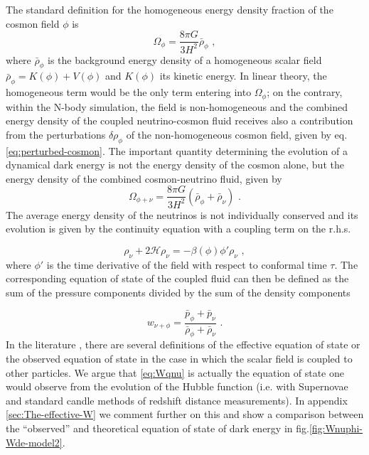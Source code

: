 The standard definition for the homogeneous energy density fraction
of the cosmon field $\phi$ is 
\begin{equation}
\Omega_{\phi}=\frac{8\pi G}{3H^{2}}\bar{\rho}_{\phi}\,\,,
\end{equation}
where $\bar{\rho}_{\phi}$ is the background energy density of a homogeneous
scalar field $\bar{\rho}_{\phi}=K(\phi)+V(\phi)$ and $K(\phi)$ its
kinetic energy. In linear theory, the homogeneous term would be the
only term entering into $\Omega_{\phi}$; on the contrary, within
the N-body simulation, the field is non-homogeneous and the combined
energy density of the coupled neutrino-cosmon fluid receives also
a contribution from the perturbations $\delta\rho_{\phi}$ of the
non-homogeneous cosmon field, given by eq.\ref{eq:perturbed-cosmon}.
The important quantity determining the evolution of a dynamical dark
energy is not the energy density of the cosmon alone, but the energy
density of the combined cosmon-neutrino fluid, given by 
\begin{equation}
\Omega_{\phi+\nu}=\frac{8\pi G}{3H^{2}}\left(\bar{\rho}_{\phi}+\bar{\rho}_{\nu}\right)\,\,.\label{eq:Omega-cosmon+nu}
\end{equation}
The average energy density of the neutrinos is not individually conserved
and its evolution is given by the continuity equation with a coupling
term on the r.h.s. \cite{ayaita_structure_2012,baldi_hydrodynamical_2010}

\begin{equation}
\rho_{\nu}+2\mathcal{H}\rho_{\nu}=-\beta(\phi)\phi'\rho_{\nu}\,\,,
\end{equation}
where $\phi'$ is the time derivative of the field with respect to
conformal time $\tau$. The corresponding equation of state of the
coupled fluid can then be defined as the sum of the pressure components
divided by the sum of the density components

\begin{equation}
w_{\nu+\phi}=\frac{\bar{p}_{\phi}+\bar{p}_{\nu}}{\bar{\rho}_{\phi}+\bar{\rho}_{\nu}}\,\,.\label{eq:Wqnu}
\end{equation}
In the literature \cite{brookfield_cosmology_2007,das_super-acceleration_2006,perrotta_extended_1999,perrotta_dark_2002},
there are several definitions of the effective equation of state or
the observed equation of state in the case in which the scalar field
is coupled to other particles. We argue that \ref{eq:Wqnu}
is actually the equation of state one would observe from the evolution
of the Hubble function (i.e. with Supernovae and standard candle methods
of redshift distance measurements). In appendix \ref{sec:The-effective-W}
we comment further on this and show a comparison between the ``observed''
and theoretical equation of state of dark energy in fig.\ref{fig:Wnuphi-Wde-model2}.

